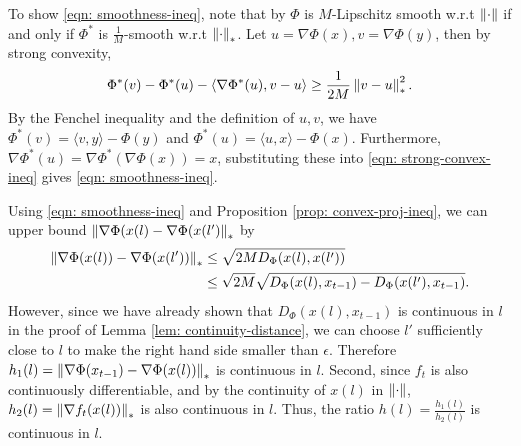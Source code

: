 To show \eqref{eqn: smoothness-ineq}, note that by \cite[Theorem 1]{kakade2009}
 $\Phi$ is $M$-Lipschitz smooth w.r.t $\left\lVert \cdot \right\rVert$ if and only if $\Phi^*$ is $\frac{1}{M}$-smooth w.r.t $\left\lVert \cdot \right\rVert_*$. Let $u = \nabla \Phi(x), v = \nabla \Phi(y)$, then by strong convexity, 
 \begin{equation}
  \Phi^*(v) - \Phi^*(u) - \langle \nabla \Phi^*(u), v - u \rangle \ge \frac{1}{2M} \left\lVert  v - u \right\rVert_*^2.
  \label{eqn: strong-convex-ineq}
  \end{equation}
 By the Fenchel inequality and the definition of $u, v$, we have $\Phi^*(v) = \langle v, y \rangle - \Phi(y)$ and $\Phi^*(u) = \langle u, x \rangle - \Phi(x)$. Furthermore, $\nabla \Phi^*(u) = \nabla \Phi^* (\nabla \Phi(x)) = x$, substituting these into \eqref{eqn: strong-convex-ineq} gives \eqref{eqn: smoothness-ineq}.
  

Using \eqref{eqn: smoothness-ineq} and Proposition \ref{prop: convex-proj-ineq}, we can upper bound $ \left\lVert \nabla \Phi(x(l) - \nabla \Phi(x(l') \right\rVert_*$ by 
\begin{align*}
	\left\lVert \nabla \Phi(x(l)) - \nabla \Phi(x(l')) \right\rVert_* &\le \sqrt{2M D_\Phi(x(l), x(l'))} \\
	&\le \sqrt{2M }\sqrt{ D_\Phi(x(l), x_{t-1} ) - D_\Phi(x(l'), x_{t-1}) }.
\end{align*}
However, since we have already shown that $D_\Phi(x(l), x_{t-1})$ is continuous in $l$ in the proof of Lemma \ref{lem: continuity-distance}, we can choose $l'$ sufficiently close to $l$ to make the right hand side smaller than $\epsilon$. Therefore $h_1(l) = \left\lVert \nabla \Phi(x_{t-1})- \nabla\Phi(x(l)) \right\rVert_*$ is continuous in $l$. Second, since $f_t$ is also continuously differentiable, and by the continuity of $x(l)$ in $\left\lVert \cdot \right\rVert$, $h_2(l) = \left\lVert \nabla f_t(x(l)) \right\rVert_*$ is also continuous in $l$. Thus, the ratio $h(l) = \frac{h_1(l)}{h_2(l)}$ is continuous in $l$.



